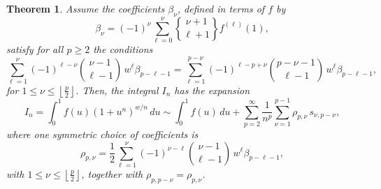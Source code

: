 \documentclass[10pt,reqno,a4paper]{amsart}%
\newtheorem{theorem}{Theorem}
\theoremstyle{definition}
\begin{document}




\begin{theorem}
Assume the coefficients $\beta_{\nu}$, defined in terms of $f$ by
\[
\beta_{\nu}=(-1)^{\nu}\sum_{\ell=0}^{\nu}%
\genfrac{\{}{\}}{0pt}{}{\nu+1}{\ell+1}%
f^{(\ell)}(1),
\]
satisfy for all $p\geq2$ the conditions
\[
\sum_{\ell=1}^{\nu}(-1)^{\ell-\nu}\binom{\nu-1}{\ell-1}\,w^{\ell}\beta
_{p-\ell-1}=\sum_{\ell=1}^{p-\nu}(-1)^{\ell-p+\nu}\binom{p-\nu-1}{\ell
-1}\,w^{\ell}\beta_{p-\ell-1},
\]
for $1\leq\nu\leq\left\lfloor \frac{p}{2}\right\rfloor$. Then, the integral $I_{n}$ has the expansion
\[
I_{n}=\int_{0}^{1}f(u)(1+u^{n})^{w/n}\,du\sim\int_{0}^{1}f(u)\,du+\sum
_{p=2}^{\infty}\frac{1}{n^{p}}\sum_{\nu=1}^{p-1}\rho_{p,\nu}\,s_{\nu,p-\nu},
\]
where one symmetric choice of coefficients is
\[
\rho_{p,\nu}=\frac{1}{2}\sum_{\ell=1}^{\nu}(-1)^{\nu-\ell}\binom{\nu-1}%
{\ell-1}\,w^{\ell}\beta_{p-\ell-1},
\]
with $1\leq\nu\leq\left\lfloor \frac{p}{2}\right\rfloor $, together with
$\rho_{p,p-\nu}=\rho_{p,\nu}$.
\end{theorem}

\end{document}
